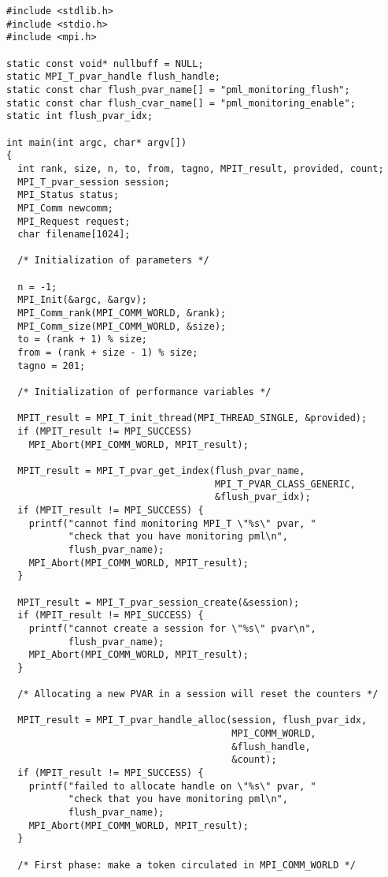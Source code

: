 \documentclass[notitlepage]{article}
\begin{document}
\begin{verbatim}
#include <stdlib.h>
#include <stdio.h>
#include <mpi.h>

static const void* nullbuff = NULL;
static MPI_T_pvar_handle flush_handle;
static const char flush_pvar_name[] = "pml_monitoring_flush";
static const char flush_cvar_name[] = "pml_monitoring_enable";
static int flush_pvar_idx;

int main(int argc, char* argv[])
{
  int rank, size, n, to, from, tagno, MPIT_result, provided, count;
  MPI_T_pvar_session session;
  MPI_Status status;
  MPI_Comm newcomm;
  MPI_Request request;
  char filename[1024];

  /* Initialization of parameters */

  n = -1;
  MPI_Init(&argc, &argv);
  MPI_Comm_rank(MPI_COMM_WORLD, &rank);
  MPI_Comm_size(MPI_COMM_WORLD, &size);
  to = (rank + 1) % size;
  from = (rank + size - 1) % size;
  tagno = 201;

  /* Initialization of performance variables */

  MPIT_result = MPI_T_init_thread(MPI_THREAD_SINGLE, &provided);
  if (MPIT_result != MPI_SUCCESS)
    MPI_Abort(MPI_COMM_WORLD, MPIT_result);

  MPIT_result = MPI_T_pvar_get_index(flush_pvar_name, 
                                     MPI_T_PVAR_CLASS_GENERIC, 
                                     &flush_pvar_idx);
  if (MPIT_result != MPI_SUCCESS) {
    printf("cannot find monitoring MPI_T \"%s\" pvar, "
           "check that you have monitoring pml\n",
           flush_pvar_name);
    MPI_Abort(MPI_COMM_WORLD, MPIT_result);
  }

  MPIT_result = MPI_T_pvar_session_create(&session);
  if (MPIT_result != MPI_SUCCESS) {
    printf("cannot create a session for \"%s\" pvar\n", 
           flush_pvar_name);
    MPI_Abort(MPI_COMM_WORLD, MPIT_result);
  }

  /* Allocating a new PVAR in a session will reset the counters */

  MPIT_result = MPI_T_pvar_handle_alloc(session, flush_pvar_idx,
                                        MPI_COMM_WORLD, 
                                        &flush_handle, 
                                        &count);
  if (MPIT_result != MPI_SUCCESS) {
    printf("failed to allocate handle on \"%s\" pvar, "
           "check that you have monitoring pml\n",
           flush_pvar_name);
    MPI_Abort(MPI_COMM_WORLD, MPIT_result);
  }

  /* First phase: make a token circulated in MPI_COMM_WORLD */


\end{verbatim}
\end{document}
